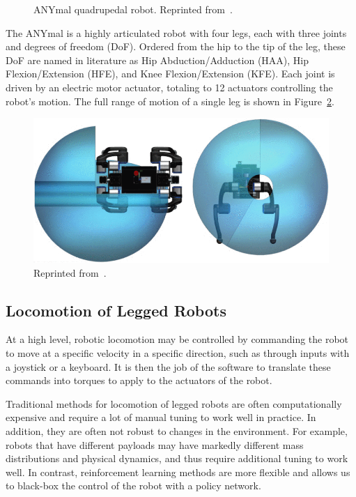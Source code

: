 \documentclass[12pt]{report}
\theoremstyle{definition}
\theoremstyle{remark}
\begin{document}
\begin{figure}[h]
\begin{subfigure}[b]{0.55\linewidth}
    \end{subfigure}
    \caption{ANYmal quadrupedal robot. Reprinted from~\cite{hutter_anymal_2016}.}
    \label{fig:anymal}
\end{figure}

The ANYmal is a highly articulated robot with four legs, each with three joints and degrees of freedom (DoF). Ordered from the hip to the tip of the leg, these DoF are named in literature as Hip Abduction/Adduction (HAA), Hip Flexion/Extension (HFE), and Knee Flexion/Extension (KFE). Each joint is driven by an electric motor actuator, totaling to 12 actuators controlling the robot's motion. The full range of motion of a single leg is shown in Figure~\ref{fig:anymal-joint-range}.
\begin{figure}[h]
    \centering
    \includegraphics[width=0.7\linewidth]{figs/anymal_range_of_motion.png}
    \caption{Reprinted from~\cite{hutter_anymal_2016}.}
    \label{fig:anymal-joint-range}
\end{figure}

\subsection{Locomotion of Legged Robots}

At a high level, robotic locomotion may be controlled by commanding the robot to move at a specific velocity in a specific direction, such as through inputs with a joystick or a keyboard. It is then the job of the software to translate these commands into torques to apply to the actuators of the robot.

Traditional methods for locomotion of legged robots are often computationally expensive and require a lot of manual tuning to work well in practice. In addition, they are often not robust to changes in the environment. For example, robots that have different payloads may have markedly different mass distributions and physical dynamics, and thus require additional tuning to work well. In contrast, reinforcement learning methods are more flexible and allows us to black-box the control of the robot with a policy network.
\end{document}
